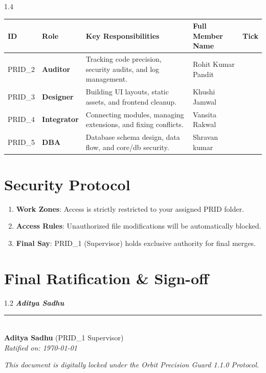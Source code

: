 \documentclass[11pt,a4paper]{article}
\newcommand{\checkedbox}{\makebox[0pt][l]{$\square$}\raisebox{.15ex}{\hspace{0.1em}$\checkmark$}}
\begin{document}
\vspace{5mm}
\begin{spacing}{1.4}
\noindent \begin{tabular}{|l|l|p{5cm}|p{4.5cm}|c|}
\hline
\textbf{ID} & \textbf{Role} & \textbf{Key Responsibilities} & \textbf{Full Member Name} & \textbf{Tick} \\
\hline
PRID\_2 & \textbf{Auditor} & Tracking code precision, security audits, and log management. & Rohit Kumar Pandit & \checkedbox \\
\hline
PRID\_3 & \textbf{Designer} & Building UI layouts, static assets, and frontend cleanup. & Khushi Jamwal & \checkedbox \\
\hline
PRID\_4 & \textbf{Integrator} & Connecting modules, managing extensions, and fixing conflicts. & Vansita Rakwal & \checkedbox \\
\hline
PRID\_5 & \textbf{DBA} & Database schema design, data flow, and core/db security. & Shravan kumar & \checkedbox \\
\hline
\end{tabular}
\end{spacing}

\section{Security Protocol}
\begin{enumerate}
    \item \textbf{Work Zones}: Access is strictly restricted to your assigned PRID folder.
    \item \textbf{Access Rules}: Unauthorized file modifications will be automatically blocked.
    \item \textbf{Final Say}: PRID\_1 (Supervisor) holds exclusive authority for final merges.
\end{enumerate}

\vspace{10mm}

\section{Final Ratification \& Sign-off}
\vspace{5mm}

\begin{flushright}
\begin{spacing}{1.2}
    {\large \textbf{\textit{Aditya Sadhu \checkmark}}} \\
    \rule{6.5cm}{0.6pt} \\
    \textbf{Aditya Sadhu} (PRID\_1 Supervisor) \\
    \footnotesize \textit{Ratified on: \today}
\end{spacing}
\end{flushright}

\vspace{10mm}
\begin{center}
    \small \textit{This document is digitally locked under the Orbit Precision Guard 1.1.0 Protocol.}
\end{center}
\end{document}
